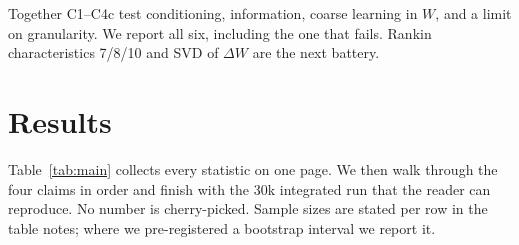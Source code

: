 \documentclass[11pt,a4paper]{article}
\begin{document}
Together C1--C4c test conditioning, information, coarse learning in $W$, and a limit on granularity. We report all six, including the one that fails. Rankin characteristics 7/8/10 and SVD of $\Delta W$ are the next battery.

\section{Results}
\label{sec:results}

Table~\ref{tab:main} collects every statistic on one page. We then walk through the four claims in order and finish with the 30k integrated run that the reader can reproduce. No number is cherry-picked. Sample sizes are stated per row in the table notes; where we pre-registered a bootstrap interval we report it.

\begin{table}[h]
\centering
\caption{All outcomes (v0.13). Grid battery vs continuous v0.12 are separated. Sample sizes in Notes. CI is 95\% bootstrap (2,000 resamples). $d$ is Cohen's $d$. The negative result (C3) is kept and renamed.}
\label{tab:main}
\end{table}
\end{document}
